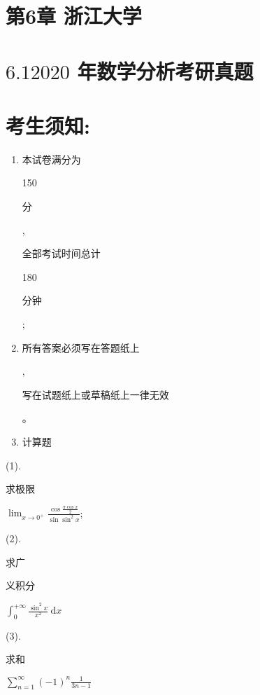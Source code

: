 \documentclass[10pt]{article}
\begin{document}
\section{第6章 浙江大学}
\section{$6.12020$ 年数学分析考研真题}
\section{考生须知:}
\begin{enumerate}
  \item \begin{CJK}{UTF8}{mj}本试卷满分为\end{CJK} 150 \begin{CJK}{UTF8}{mj}分\end{CJK}, \begin{CJK}{UTF8}{mj}全部考试时间总计\end{CJK} 180 \begin{CJK}{UTF8}{mj}分钟\end{CJK};

  \item \begin{CJK}{UTF8}{mj}所有答案必须写在答题纸上\end{CJK}, \begin{CJK}{UTF8}{mj}写在试题纸上或草稿纸上一律无效\end{CJK}。

  \item \begin{CJK}{UTF8}{mj}计算题\end{CJK}

\end{enumerate}
(1). \begin{CJK}{UTF8}{mj}求极限\end{CJK} $\lim _{x \rightarrow 0^{+}} \frac{\cos \frac{\pi \cos x}{2}}{\sin \sin ^{2} x}$;

(2). \begin{CJK}{UTF8}{mj}求广\end{CJK} \begin{CJK}{UTF8}{mj}义积分\end{CJK} $\int_{0}^{+\infty} \frac{\sin ^{2} x}{x^{2}} \mathrm{~d} x$

(3). \begin{CJK}{UTF8}{mj}求和\end{CJK} $\sum_{n=1}^{\infty}(-1)^{n} \frac{1}{3 n-1}$
\end{document}
